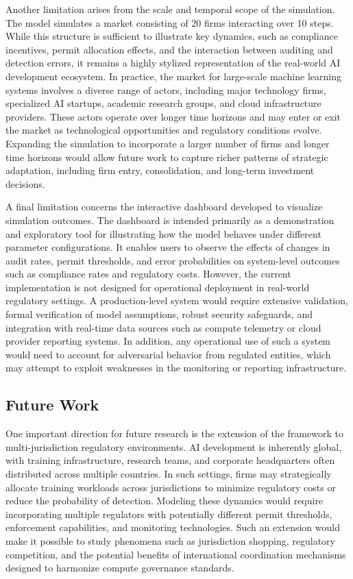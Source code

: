 Another limitation arises from the scale and temporal scope of the simulation. The model simulates a market consisting of 20 firms interacting over 10 steps. While this structure is sufficient to illustrate key dynamics, such as compliance incentives, permit allocation effects, and the interaction between auditing and detection errors, it remains a highly stylized representation of the real-world AI development ecosystem. In practice, the market for large-scale machine learning systems involves a diverse range of actors, including major technology firms, specialized AI startups, academic research groups, and cloud infrastructure providers. These actors operate over longer time horizons and may enter or exit the market as technological opportunities and regulatory conditions evolve. Expanding the simulation to incorporate a larger number of firms and longer time horizons would allow future work to capture richer patterns of strategic adaptation, including firm entry, consolidation, and long-term investment decisions.

A final limitation concerns the interactive dashboard developed to visualize simulation outcomes. The dashboard is intended primarily as a demonstration and exploratory tool for illustrating how the model behaves under different parameter configurations. It enables users to observe the effects of changes in audit rates, permit thresholds, and error probabilities on system-level outcomes such as compliance rates and regulatory costs. However, the current implementation is not designed for operational deployment in real-world regulatory settings. A production-level system would require extensive validation, formal verification of model assumptions, robust security safeguards, and integration with real-time data sources such as compute telemetry or cloud provider reporting systems. In addition, any operational use of such a system would need to account for adversarial behavior from regulated entities, which may attempt to exploit weaknesses in the monitoring or reporting infrastructure.

\subsection{Future Work}
One important direction for future research is the extension of the framework to multi-jurisdiction regulatory environments. AI development is inherently global, with training infrastructure, research teams, and corporate headquarters often distributed across multiple countries. In such settings, firms may strategically allocate training workloads across jurisdictions to minimize regulatory costs or reduce the probability of detection. Modeling these dynamics would require incorporating multiple regulators with potentially different permit thresholds, enforcement capabilities, and monitoring technologies. Such an extension would make it possible to study phenomena such as jurisdiction shopping, regulatory competition, and the potential benefits of international coordination mechanisms designed to harmonize compute governance standards.


